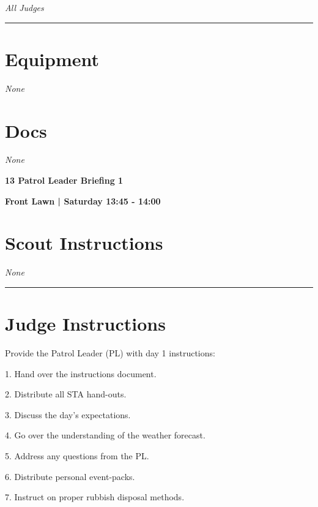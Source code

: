 \documentclass[10pt]{article}
\newcommand{\newtitle}[1]{\begin{center}{\Huge\bfseries #1 }\\ \vspace{5mm}\end{center}}
\newcommand{\newsubtitle}[1]{\begin{center}{\color{grey}\Large\bfseries #1 }\\ \vspace{5mm}\end{center}}
\begin{document}
					\textit{All Judges}
			\vspace{0.5cm}
	\hrule
	\vspace{0.5cm}

	\begin{multicols}{2}

		\section*{\faWrench \: Equipment}

				\textit{None}
		
		\vfill\null
		\columnbreak

			\section*{\faFile \: Docs}
		 	\textit{None}
	

		\vfill\null

		\end{multicols}



	\vspace{1cm}


	\clearpage
		\newtitle{13 Patrol Leader Briefing 1 }
	\newsubtitle{Front Lawn | Saturday 13:45 - 14:00}
		\setcounter{section}{12}
	\section*{Scout Instructions}
		\textit{None}
	
	\vspace{0.5cm}
	\hrule
	\vspace{0.5cm}

		\section*{Judge Instructions}
		Provide the Patrol Leader (PL) with day 1 instructions:

1. Hand over the instructions document.

2. Distribute all STA hand-outs.

3. Discuss the day's expectations.

4. Go over the understanding of the weather forecast.

5. Address any questions from the PL.

6. Distribute personal event-packs.

7. Instruct on proper rubbish disposal methods.
\end{document}
